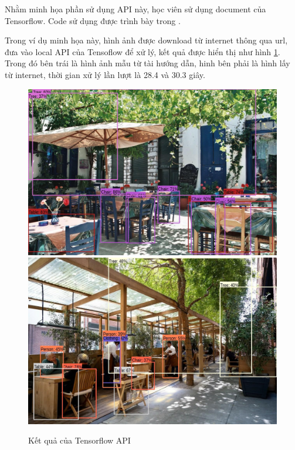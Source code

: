 Nhằm minh họa phần sử dụng API này, học viên sử dụng document của Tensorflow\cite{tensorflowapi}. Code sử dụng được trình bày trong \cite{tensorflowcode}.

Trong ví dụ minh họa này, hình ảnh được download từ internet thông qua url, đưa vào local API của Tensoflow để xử lý, kết quả được hiển thị như hình \ref{fig:tensor_result}. Trong đó bên trái là hình ảnh mẫu từ tài hướng dẫn, hinh bên phải là hình lấy từ internet, thời gian xử lý lần lượt là 28.4 và 30.3 giây.

\begin{figure}
    \centering
    \includegraphics[scale=0.25]{../code/processed/processed.jpg}\includegraphics[scale=0.25]{../code/processed/my_image.jpg}
    \caption{Kết quả của Tensorflow API}
    \label{fig:tensor_result}
\end{figure}